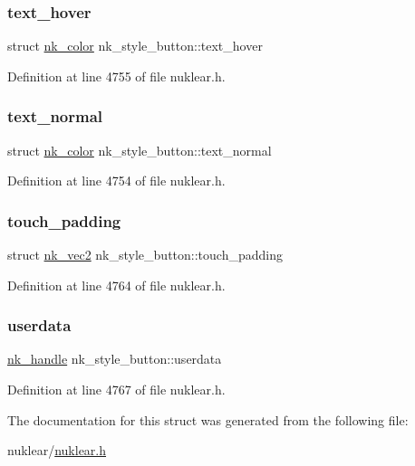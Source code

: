 \subsubsection{\texorpdfstring{text\+\_\+hover}{text\_hover}}
{\footnotesize\ttfamily struct \mbox{\hyperlink{structnk__color}{nk\+\_\+color}} nk\+\_\+style\+\_\+button\+::text\+\_\+hover}



Definition at line 4755 of file nuklear.\+h.

\mbox{\label{structnk__style__button_a70eabd8d45ca4dc60c0753c75b3b1b25}} 
\subsubsection{\texorpdfstring{text\+\_\+normal}{text\_normal}}
{\footnotesize\ttfamily struct \mbox{\hyperlink{structnk__color}{nk\+\_\+color}} nk\+\_\+style\+\_\+button\+::text\+\_\+normal}



Definition at line 4754 of file nuklear.\+h.

\mbox{\label{structnk__style__button_a70e4b8b7bc59f9b06e477c003bfab855}} 
\subsubsection{\texorpdfstring{touch\+\_\+padding}{touch\_padding}}
{\footnotesize\ttfamily struct \mbox{\hyperlink{structnk__vec2}{nk\+\_\+vec2}} nk\+\_\+style\+\_\+button\+::touch\+\_\+padding}



Definition at line 4764 of file nuklear.\+h.

\mbox{\label{structnk__style__button_a486c8383bd02dae018cacaa370bf0c43}} 
\subsubsection{\texorpdfstring{userdata}{userdata}}
{\footnotesize\ttfamily \mbox{\hyperlink{unionnk__handle}{nk\+\_\+handle}} nk\+\_\+style\+\_\+button\+::userdata}



Definition at line 4767 of file nuklear.\+h.



The documentation for this struct was generated from the following file\+:\begin{DoxyCompactItemize}
\item 
nuklear/\mbox{\hyperlink{nuklear_8h}{nuklear.\+h}}\end{DoxyCompactItemize}
